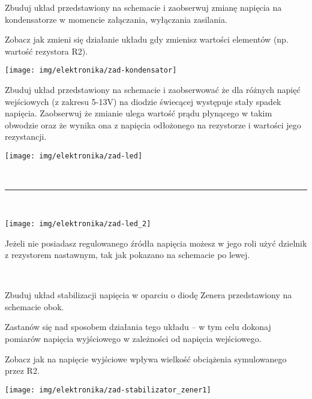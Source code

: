 \dbEntryCheckResults
\noindent\begin{minipage}[b]{0.55\textwidth}
Zbuduj układ przedstawiony na schemacie i zaobserwuj zmianę napięcia na kondensatorze w momencie załączania, wyłączania zasilania.

\vspace{13pt}

Zobacz jak zmieni się działanie układu gdy zmienisz wartości elementów (np. wartość rezystora R2).

\ifdefined\ladowanieKondensatoraWartosci\vspace{13pt}\ladowanieKondensatoraWartosci\fi
\end{minipage}
\hfill
\begin{minipage}[b]{0.4\textwidth}
\texttt{[image: img/elektronika/zad-kondensator]}
\end{minipage}
\fi


\dbEntryCheckResults
\noindent\begin{minipage}[b]{0.7\textwidth}
Zbuduj układ przedstawiony na schemacie i zaobserwować że dla różnych napięć wejściowych (z zakresu 5-13V) na diodzie świecącej występuje stały spadek napięcia.
Zaobserwuj że zmianie ulega wartość prądu płynącego w takim obwodzie oraz że wynika ona z napięcia odłożonego na rezystorze i wartości jego rezystancji.
\end{minipage}
\hfill
\begin{minipage}[b]{0.25\textwidth}
\texttt{[image: img/elektronika/zad-led]}\vspace{0.5cm}
\end{minipage}

\hfill \rule{0.8\textwidth}{.3pt}\hfill 

\noindent\begin{minipage}[b]{0.27\textwidth}
\texttt{[image: img/elektronika/zad-led\_2]}
\end{minipage}
\hfill
\begin{minipage}[b]{0.6\textwidth}
Jeżeli nie posiadasz regulowanego źródła napięcia możesz w jego roli użyć dzielnik z rezystorem nastawnym, tak jak pokazano na schemacie po lewej.
\vspace{1.3cm}
\end{minipage}
\hfill 
\fi


\dbEntryCheckResults
\noindent\begin{minipage}[b]{0.77\textwidth}
Zbuduj układ stabilizacji napięcia w oparciu o diodę Zenera przedstawiony na schemacie obok.

Zastanów się nad sposobem działania tego układu – w tym celu dokonaj pomiarów napięcia wyjściowego w zależności od napięcia wejściowego.

Zobacz jak na napięcie wyjściowe wpływa wielkość obciążenia symulowanego przez R2.
\vspace{13pt}
\end{minipage}
\hfill
\begin{minipage}[b]{0.17\textwidth}
\texttt{[image: img/elektronika/zad-stabilizator\_zener1]}
\end{minipage}
\fi
